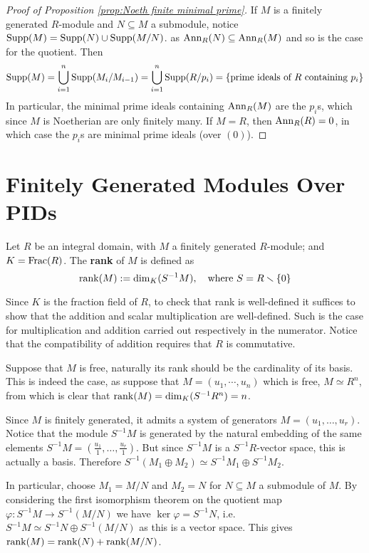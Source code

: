 \begin{proof}[Proof of Proposition \ref{prop:Noeth finite minimal prime}]
    If $M$ is a finitely generated $R$-module and $N\subseteq M$ a submodule, notice $\mathrm{Supp}(M) = \mathrm{Supp}(N) \cup \mathrm{Supp}(M/N)$. as $\mathrm{Ann}_R(N) \subseteq \mathrm{Ann}_R(M)$ and so is the case for the quotient. Then
    \[
        \mathrm{Supp}(M) = \bigcup_{i=1}^n \mathrm{Supp}(M_i/M_{i-1}) = \bigcup_{i=1}^n \mathrm{Supp}(R/p_i) = \{ \text{prime ideals of }R \text{ containing } p_i \}
    \]
    In particular, the minimal prime ideals containing $\mathrm{Ann}_R(M)$ are the $p_i$s, which since $M$ is Noetherian are only finitely many.
    If $M = R$, then $\mathrm{Ann}_R(R) = 0$, in which case the $p_i$s are minimal prime ideals (over $(0)$).
\end{proof}

\section{Finitely Generated Modules Over PIDs}

\begin{definition}[Rank]
    Let $R$ be an integral domain, with $M$ a finitely generated $R$-module; and $K = \mathrm{Frac}(R)$. The \textbf{rank} of $M$ is defined as
    \[
        \mathrm{rank}(M) := \dim_K (S^{-1}M), \quad\text{where } S = R\smallsetminus\{0\}
    \]
\end{definition}

\begin{remark}
    Since $K$ is the fraction field of $R$, to check that rank is well-defined it suffices to show that the addition and scalar multiplication are well-defined. Such is the case for multiplication and addition carried out respectively in the numerator. Notice that the compatibility of addition requires that $R$ is commutative.
        
    Suppose that $M$ is free, naturally its rank should be the cardinality of its basis. This is indeed the case, as suppose that $M = (u_1, \cdots, u_n)$ which is free, $M \simeq R^n$, from which is clear that $\mathrm{rank}(M) = \dim_K (S^{-1} R^n) = n$.
\end{remark}

\begin{remark}
    Since $M$ is finitely generated, it admits a system of generators $M = (u_1, \ldots, u_r)$. Notice that the module $S^{-1}M$ is generated by the natural embedding of the same elements $S^{-1}M = (\frac{u_1}{1}, \ldots, \frac{u_r}{1})$. But since $S^{-1}M$ is a $S^{-1}R$-vector space, this is actually a basis. Therefore $S^{-1}(M_1 \oplus M_2) \simeq S^{-1} M_1 \oplus S^{-1} M_2$. 
    
    In particular, choose $M_1 = M/N$ and $M_2 = N$ for $N \subseteq M$ a submodule of $M$. By considering the first isomorphism theorem on the quotient map $\varphi: S^{-1}M \to S^{-1}(M/N)$ we have $\ker \varphi = S^{-1}N$, i.e. $S^{-1}M \simeq S^{-1}N \oplus S^{-1}(M/N)$ as this is a vector space. This gives $\mathrm{rank}(M) = \mathrm{rank}(N) + \mathrm{rank}(M/N)$. 
\end{remark}

